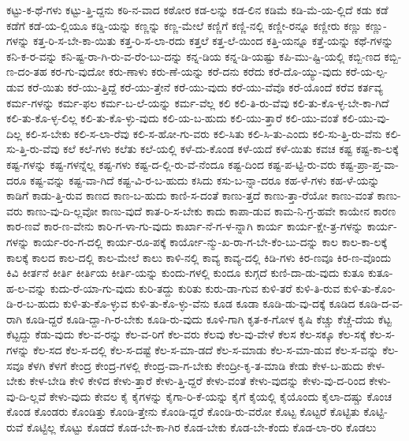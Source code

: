 {ಕಟ್ಟು-ಕ-ಥೆ-ಗಳು
ಕಟ್ಟು-ತ್ತಿ-ದ್ದನು
ಕಠಿ-ನ-ವಾದ
ಕಠೋರ
ಕಡ-ಲನ್ನು
ಕಡ-ಲಿನ
ಕಡಿಮೆ
ಕಡಿ-ಮೆ-ಯ-ಲ್ಲಿದೆ
ಕಡು
ಕಡೆ
ಕಡೆಗೆ
ಕಡೆ-ಯ-ಲ್ಲಿಯೂ
ಕಡ್ಡಿ-ಯನ್ನು
ಕಣ್ಣನ್ನು
ಕಣ್ಣ-ಮೇಲೆ
ಕಣ್ಣಿಗೆ
ಕಣ್ಣಿ-ನಲ್ಲಿ
ಕಣ್ಣೀ-ರನ್ನೂ
ಕಣ್ಣೀರು
ಕಣ್ಣು
ಕಣ್ಣು-ಗಳನ್ನು
ಕತ್ತ-ರಿ-ಸ-ಬೇ-ಕಾ-ಯಿತು
ಕತ್ತ-ರಿ-ಸ-ಲಾ-ರದು
ಕತ್ತಲೆ
ಕತ್ತ-ಲೆ-ಯಿಂದ
ಕತ್ತಿ-ಯನ್ನೂ
ಕತ್ತೆ-ಯನ್ನು
ಕಥೆ-ಗಳನ್ನು
ಕನಿ-ಕ-ರ-ವನ್ನು
ಕನಿ-ಷ್ಟ-ರಾ-ಗಿ-ರು-ವ-ರೆಂ-ಬು-ದನ್ನು
ಕನ್ನ-ಡಿಯ
ಕನ್ನ-ಡಿ-ಯಷ್ಟು
ಕಪಿ-ಮು-ಷ್ಟಿ-ಯಲ್ಲಿ
ಕಬ್ಬಿ-ಣದ
ಕಬ್ಬಿ-ಣ-ದಂ-ತಹ
ಕರ-ಗು-ವುದೋ
ಕರು-ಣಾಳು
ಕರು-ಣೆ-ಯನ್ನು
ಕರೆ-ದನು
ಕರೆದು
ಕರೆ-ದೊ-ಯ್ಯು-ವುದು
ಕರೆ-ಯ-ಲ್ಪ-ಡುವ
ಕರೆ-ಯಿತು
ಕರೆ-ಯು-ತ್ತಿದ್ದೆ
ಕರೆ-ಯು-ತ್ತೇನೆ
ಕರೆ-ಯು-ವುದು
ಕರೆ-ಯು-ವೆವೊ
ಕರೆ-ಯೊಂದೆ
ಕರೆವ
ಕರ್ತವ್ಯ
ಕರ್ಮ-ಗಳನ್ನು
ಕರ್ಮ-ಫಲ
ಕರ್ಮ-ಬ-ಲೆ-ಯನ್ನು
ಕರ್ಮ-ವೆಲ್ಲ
ಕಲಿ
ಕಲಿ-ತಿ-ರು-ವೆವು
ಕಲಿ-ತು-ಕೊ-ಳ್ಳ-ಬೇ-ಕಾ-ಗಿದೆ
ಕಲಿ-ತು-ಕೊ-ಳ್ಳ-ಲಿಲ್ಲ
ಕಲಿ-ತು-ಕೊ-ಳ್ಳು-ವುದು
ಕಲಿ-ಯ-ಬ-ಹುದು
ಕಲಿ-ಯು-ತ್ತಾರೆ
ಕಲಿ-ಯು-ವಂತೆ
ಕಲಿ-ಯು-ವು-ದಿಲ್ಲ
ಕಲಿ-ಸ-ಬೇಕು
ಕಲಿ-ಸ-ಲಾ-ರೆವು
ಕಲಿ-ಸ-ಹೋ-ಗು-ವರು
ಕಲಿ-ಸಿತು
ಕಲಿ-ಸಿ-ತು-ಎಂದು
ಕಲಿ-ಸು-ತ್ತಿ-ರು-ವೆನು
ಕಲಿ-ಸು-ತ್ತಿ-ರು-ವೆವು
ಕಲೆ
ಕಲೆ-ಗಳು
ಕಲೆತು
ಕಲೆ-ಯಲ್ಲಿ
ಕಳೆ-ದು-ಕೊಂಡ
ಕಳೆ-ಯದೆ
ಕಳೆ-ಯಿತು
ಕವಚ
ಕಷ್ಟ
ಕಷ್ಟ-ಕಾ-ಲಕ್ಕೆ
ಕಷ್ಟ-ಗಳನ್ನು
ಕಷ್ಟ-ಗಳನ್ನೆಲ್ಲ
ಕಷ್ಟ-ಗಳು
ಕಷ್ಟ-ದ-ಲ್ಲಿ-ರು-ವೆ-ನೆಂದೂ
ಕಷ್ಟ-ದಿಂದ
ಕಷ್ಟ-ಪ-ಟ್ಟಿ-ರು-ವರು
ಕಷ್ಟ-ಪ್ರಾ-ಪ್ತ-ವಾ-ದರೂ
ಕಷ್ಟ-ವನ್ನು
ಕಷ್ಟ-ವಾ-ಗಿದೆ
ಕಷ್ಟ-ವಿ-ರ-ಬ-ಹುದು
ಕಸಿದು
ಕಸು-ಬ-ನ್ನಾ-ದರೂ
ಕಹ-ಳೆ-ಗಳು
ಕಹ-ಳೆ-ಯನ್ನು
ಕಾಡಿಗೆ
ಕಾಡು-ತ್ತಿ-ರುವ
ಕಾಣದ
ಕಾಣ-ಬ-ಹುದು
ಕಾಣಿ-ಸ-ದಂತೆ
ಕಾಣು-ತ್ತದೆ
ಕಾಣು-ತ್ತಾ-ರೆಯೋ
ಕಾಣು-ವಂತೆ
ಕಾಣು-ವರು
ಕಾಣು-ವು-ದಿ-ಲ್ಲವೋ
ಕಾಣು-ವುದೆ
ಕಾತ-ರಿ-ಸ-ಬೇಕು
ಕಾದು
ಕಾಪಾ-ಡುವ
ಕಾಮ-ನಿ-ಗ್ರ-ಹವೇ
ಕಾಯೇನ
ಕಾರಣ
ಕಾರ-ಣವೆ
ಕಾರ-ಣ-ವೇನು
ಕಾರಿ-ಗ-ಳಾ-ಗು-ವುದು
ಕಾರ್ಖಾ-ನೆ-ಗ-ಳ-ನ್ನಾಗಿ
ಕಾರ್ಯ
ಕಾರ್ಯ-ಕ್ಷೇ-ತ್ರ-ಗಳನ್ನು
ಕಾರ್ಯ-ಗಳನ್ನು
ಕಾರ್ಯ-ರಂ-ಗ-ದಲ್ಲಿ
ಕಾರ್ಯ-ರೂ-ಪಕ್ಕೆ
ಕಾರ್ಯೋ-ನ್ಮು-ಖ-ರಾ-ಗ-ಬೇ-ಕೆಂ-ಬು-ದನ್ನು
ಕಾಲ
ಕಾಲ-ಕಾ-ಲಕ್ಕೆ
ಕಾಲಕ್ಕೆ
ಕಾಲದ
ಕಾಲ-ದಲ್ಲಿ
ಕಾಲ-ಮೇಲೆ
ಕಾಲು
ಕಾಳಿ-ನಲ್ಲಿ
ಕಾವ್ಯ
ಕಾವ್ಯ-ದಲ್ಲಿ
ಕಿಡಿ-ಗಳು
ಕಿರ-ಣವೂ
ಕಿರ-ಣ-ವೊಂದು
ಕಿವಿ
ಕೀರ್ತನೆ
ಕೀರ್ತಿ
ಕೀರ್ತಿಯ
ಕೀರ್ತಿ-ಯನ್ನು
ಕುಂದು-ಗಳಲ್ಲಿ
ಕುಂದೂ
ಕುಗ್ಗದೆ
ಕುಣಿ-ದಾ-ಡು-ವುದು
ಕುತೂ
ಕುತೂ-ಹ-ಲ-ವನ್ನು
ಕುದು-ರೆ-ಯಾ-ಗು-ವುದು
ಕುರಿ-ತದ್ದು
ಕುರಿತು
ಕುರು-ಡಾ-ಗುವ
ಕುಳಿ-ತರೆ
ಕುಳಿ-ತಿ-ರುವ
ಕುಳಿ-ತು-ಕೊಂ-ಡಿ-ರ-ಬ-ಹುದು
ಕುಳಿ-ತು-ಕೊ-ಳ್ಳುವ
ಕುಳಿ-ತು-ಕೊ-ಳ್ಳು-ವೆನು
ಕೂಡ
ಕೂಡಾ
ಕೂಡಿ-ಡು-ವು-ದಕ್ಕೆ
ಕೂಡಿದ
ಕೂಡಿ-ದ-ವ-ರಾಗಿ
ಕೂಡಿ-ದ್ದರೆ
ಕೂಡಿ-ದ್ದಾ-ಗಿ-ರ-ಬೇಕು
ಕೂಡಿ-ರು-ವುದು
ಕೂಳಿ-ಗಾಗಿ
ಕೃತ-ಕ-ಗೋಳ
ಕೃಷಿ
ಕೆಚ್ಚು
ಕೆಚ್ಚೆ-ದೆಯ
ಕೆಟ್ಟ
ಕೆಟ್ಟದ್ದು
ಕೆಡು-ವುದು
ಕೆಲ-ವ-ರನ್ನು
ಕೆಲ-ವ-ರಿಗೆ
ಕೆಲ-ವರು
ಕೆಲವು
ಕೆಲ-ವು-ವೇಳೆ
ಕೆಲಸ
ಕೆಲ-ಸಕ್ಕೂ
ಕೆಲ-ಸಕ್ಕೆ
ಕೆಲ-ಸ-ಗಳನ್ನು
ಕೆಲ-ಸದ
ಕೆಲ-ಸ-ದಲ್ಲಿ
ಕೆಲ-ಸ-ದಷ್ಟೆ
ಕೆಲ-ಸ-ಮಾ-ಡದೆ
ಕೆಲ-ಸ-ಮಾಡು
ಕೆಲ-ಸ-ಮಾ-ಡುವ
ಕೆಲ-ಸ-ವನ್ನು
ಕೆಲ-ಸವೂ
ಕೆಳಗಿ
ಕೆಳಗೆ
ಕೇಂದ್ರ
ಕೇಂದ್ರ-ಗಳಲ್ಲಿ
ಕೇಂದ್ರ-ವಾ-ಗ-ಬೇಕು
ಕೇಂದ್ರೀ-ಕೃ-ತ-ಮಾಡಿ
ಕೇಡು
ಕೇಳ-ಬ-ಹುದು
ಕೇಳ-ಬೇಕು
ಕೇಳ-ಬೇಡಿ
ಕೇಳಿ
ಕೇಳಿದ
ಕೇಳು-ತ್ತಾರೆ
ಕೇಳು-ತ್ತಿ-ದ್ದರೆ
ಕೇಳು-ವಂತೆ
ಕೇಳು-ವುದನ್ನು
ಕೇಳು-ವು-ದ-ರಿಂದ
ಕೇಳು-ವು-ದಿ-ಲ್ಲವೆ
ಕೇಳು-ವುದು
ಕೇವಲ
ಕೈ
ಕೈಗಳನ್ನು
ಕೈಗಾ-ರಿ-ಕೆ-ಯನ್ನು
ಕೈಗೆ
ಕೈಯಲ್ಲಿ
ಕೈಯೊಂದು
ಕೈಲಾ-ದಷ್ಚು
ಕೊಂಚ
ಕೊಂಡ
ಕೊಂಡರು
ಕೊಂಡಿತ್ತು
ಕೊಂಡಿ-ತ್ತೇನು
ಕೊಂಡಿ-ದ್ದರೆ
ಕೊಂಡಿ-ರು-ವರೋ
ಕೊಟ್ಟ
ಕೊಟ್ಟರೆ
ಕೊಟ್ಟಿತು
ಕೊಟ್ಟಿ-ರುವೆ
ಕೊಟ್ಟಿಲ್ಲ
ಕೊಟ್ಟು
ಕೊಡದೆ
ಕೊಡ-ಬೇ-ಕಾ-ಗಿರ
ಕೊಡ-ಬೇಕು
ಕೊಡ-ಬೇ-ಕೆಂದು
ಕೊಡ-ಲಾ-ರರಿ
ಕೊಡಲು
}
